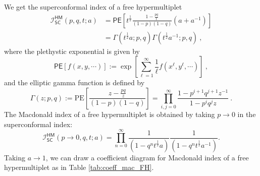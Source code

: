 \documentclass[a4paper,10pt]{article}
\newcommand{\mr}[1]{\mathsf{#1}}
\begin{document}
We get the superconformal index of a free hypermultiplet 
\begin{equation}
\begin{aligned}
    \mathcal{I}_{\mr{SC}}^{\mr{HM}}(p,q,t;a ) &= 
    \mathsf{PE}\left[
    t^{\frac{1}{2}} \frac{1-\frac{p q}{t}}{(1-p)(1-q)}\left(a+a^{-1}\right)
    \right]\\
    & = 
    \Gamma(t^{\frac{1}{2}} a; p,q)
    \Gamma(t^{\frac{1}{2}} a^{-1}; p,q)~,
\end{aligned}
\end{equation}
where the plethystic exponential is given by 
\begin{equation}
    \mr{PE}[f(x, y, \cdots)]:=\exp \left[\sum_{\ell=1}^{\infty} \frac{1}{\ell} f\left(x^{\ell}, y^{\ell}, \cdots\right)\right]~,
\end{equation}
and the elliptic gamma function is defined by 
\begin{equation}
    \Gamma(z ; p, q):=\mathrm{PE}\left[\frac{z-\frac{p q}{z}}{(1-p)(1-q)}\right]=\prod_{i, j=0}^{\infty} \frac{1-p^{i+1} q^{j+1} z^{-1}}{1-p^i q^j z}~.
\end{equation}
The Macdonald index of a free hypermultiplet is obtained by taking $p\to 0$ in the superconformal index: 
\begin{equation}
    \mathcal{I}_{\mr{SC}}^{\mr{HM}}( p\to 0, q,t; a) = 
    \prod_{n=0}^\infty 
    \frac{1}{\left(1-q^n t^{\frac{1}{2}} a\right)}
    \frac{1}{\left(1-q^n t^{\frac{1}{2}} a^{-1}\right)}.
\end{equation}
Taking $a \to 1$, we can draw a coefficient diagram for Macdonald index of a free hypermultiplet as in Table \ref{tab:coeff_mac_FH}.
\end{document}
